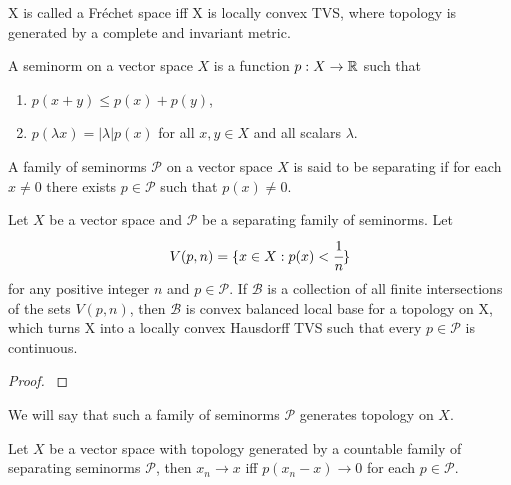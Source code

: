 \documentclass[main.tex]{subfiles}
\begin{document}
\begin{definition}
X is called a Fr\'echet space iff X is locally convex TVS, where topology is generated by a complete and invariant metric.
\end{definition}

\begin{definition}
A seminorm on a vector space $X$ is a function $p:X\to \mathbb{R}$ such that
\begin{enumerate}
\item $p(x+y) \leq p(x) + p(y)$,
\item $p(\lambda x) = |\lambda|p(x)$
for all $x,y\in X$ and all scalars $\lambda$.
\end{enumerate}
\end{definition}

\begin{definition}
A family of seminorms $\mathcal{P}$ on a vector space $X$ is said to be separating if for each $x\not=0$ there exists $p\in \mathcal{P}$ such that $p(x)\not=0$. 
\end{definition}

\begin{theorem}
\label{seminorms-topology}
Let $X$ be a vector space and $\mathcal{P}$ be a separating family of seminorms. Let
\begin{equation}
V(p,n) = \{x\in X: p(x) < \cfrac{1}{n}\} 
\end{equation}
for any positive integer $n$ and $p\in\mathcal{P}$.
If $\mathcal{B}$ is a collection of all finite intersections of the sets $V(p,n)$, then $\mathcal{B}$ is convex balanced local base for a topology on X, which turns X into a locally convex Hausdorff TVS such that every $p\in\mathcal{P}$ is continuous.
\end{theorem}
\begin{proof}
\cite[see][1.37]{rudin1991}
\end{proof}

We will say that such a family of seminorms $\mathcal{P}$ generates topology on $X$.

\begin{corollary}
\label{convergence-seminorms}
Let $X$ be a vector space with topology generated by a countable family  of separating seminorms $\mathcal{P}$, then $x_n \to x$ iff
$p(x_n - x) \to 0$ for each $p\in\mathcal{P}$. 
\end{corollary}
\end{document}
